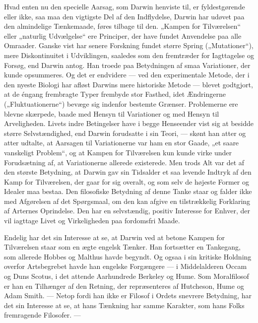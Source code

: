 \documentclass[12pt,a4paper,openany]{book}
\newcommand{\opage}[1]{\marginnote{\footnotesize\textit{[#1]}}}
\begin{document}
Hvad enten nu den specielle Aarsag, som Darwin henviste
til, er fyldestgørende eller ikke, saa maa den vigtigste Del af
den Indflydelse, Darwin har udøvet paa den almindelige Tænkemaade,
føres tilbage til den. „Kampen for Tilværelsen“ eller
„naturlig Udvælgelse“ ere Principer, der have fundet Anvendelse
paa alle Omraader. Ganske vist har senere Forskning fundet
større Spring („Mutationer“), mere Diskontinuitet i Udviklingen,
saaledes som den fremtræder for Iagttagelse og Forsøg, end
Darwin antog. Han troede paa Betydningen af smaa Variationer,
der kunde opsummeres. Og det er endvidere --- ved
den experimentale Metode, der i den nyeste Biologi har afløst
Darwins mere historiske Metode --- blevet godtgjort, at de éngang
frembragte Typer frembyde stor Fasthed, idet Ændringerne
(„Fluktuationerne“) bevæge sig indenfor bestemte Grænser.
Problemerne ere blevne skærpede, baade med Hensyn til Variationer
og med Hensyn til Arveligheden. Livets indre Betingelser
have i begge Henseender vist sig at besidde større
Selvstændighed, end Darwin forudsatte i sin Teori, --- skønt
han atter og atter udtalte, at Aarsagen til Variationerne var
\setcounter{footnote}{0}%
\opage{205}ham en stor Gaade, „et saare vanskeligt Problem“, og at Kampen
for Tilværelsen kun kunde virke under Forudsætning af,
at Variationerne allerede existerede. Men trods Alt var det af
den største Betydning, at Darwin gav sin Tidsalder et saa
levende Indtryk af den Kamp for Tilværelsen, der gaar for sig
overalt, og som selv de højeste Former og Idealer maa bestaa.
Den filosofiske Betydning af denne Tanke staar og falder ikke
med Afgørelsen af det Spørgsmaal, om den kan afgive en tilstrækkelig
Forklaring af Arternes Oprindelse. Den har en
selvstændig, positiv Interesse for Enhver, der vil iagttage Livet
og Virkeligheden paa fordomsfri Maade.

Endelig har det sin Interesse at se, at Darwin ved at betone
Kampen for Tilværelsen staar som en ægte engelsk Tænker.
Han fortsætter en Tankegang, som allerede Hobbes og Malthus
havde begyndt. Og ogsaa i sin kritiske Holdning overfor Artsbegrebet
havde han engelske Forgængere --- i Middelalderen
Occam og Duns Scotus, i det attende Aarhundrede Berkeley
og Hume. Som Moralfilosof er han en Tilhænger af den Retning,
der repræsenteres af Hutcheson, Hume og Adam Smith.
--- Netop fordi han ikke er Filosof i Ordets snevrere Betydning,
har det sin Interesse at se, at hans Tænkning har samme
Karakter, som hans Folks fremragende Filosofer. ---
\end{document}
